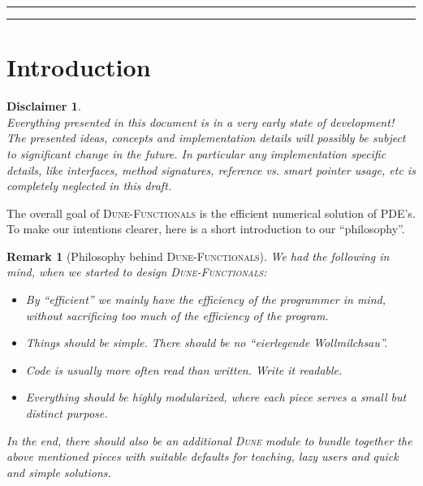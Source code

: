 \documentclass[a4paper,11pt]{article}
\title{\dunefunctionals}
\author{Felix Albrecht (\Code{felix.albrecht@uni-muenster.de})}
\date{\today}
\numberwithin{equation}{section}
\newtheorem{remark}[definition]{Remark}
\newtheorem{disclaimer}[definition]{Disclaimer}
\newcommand{\theoremNewline}{\hspace{1mm}\\}
\newcommand{\theoremEndLine}{\hspace{1mm}}
\newcommand{\dune}{\textsc{Dune}\xspace}
\newcommand{\dunefem}{\textsc{Dune-Fem}\xspace}
\newcommand{\dunefunctionals}{\textsc{Dune-Functionals}\xspace}
\newcommand{\dunepdelab}{\textsc{Dune-PDELab}\xspace}
\begin{document}
\maketitle

\begin{abstract}
	This document is a draft about a new \dune discretization module, based on \dunefem and \dunepdelab.
\end{abstract}

\hrule

\begin{small}
	\tableofcontents
\end{small}

\vspace{5mm}
\hrule


\section{Introduction}
	\label{section::introduction}


\begin{disclaimer}\theoremNewline
	\label{disclaimer::introduction}
	Everything presented in this document is in a very early state of development! The presented ideas, concepts and
	implementation details will possibly be subject to significant change in the future. In particular any implementation
	specific details, like interfaces, method signatures, reference vs. smart pointer usage, etc is completely neglected in
	this draft.  
\end{disclaimer}\theoremEndLine

The overall goal of \dunefunctionals is the efficient numerical solution of PDE's. To make our intentions clearer,
here is a short introduction to our ``philosophy''.

\begin{remark}[Philosophy behind \dunefunctionals]
	We had the following in mind, when we started to design \dunefunctionals:
  \begin{itemize}
    \item By ``efficient'' we mainly have the efficiency of the programmer in mind, without sacrificing too much of the 
			efficiency of the program.
    \item Things should be simple. There should be no ``eierlegende Wollmilchsau''.
    \item Code is usually more often read than written. Write it readable.
    \item Everything should be highly modularized, where each piece serves a small but distinct purpose.
  \end{itemize}
  In the end, there should also be an additional \dune module to bundle together the above mentioned pieces with
  suitable defaults for teaching, lazy users and quick and simple solutions.
\end{remark}
\end{document}
